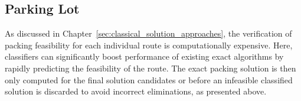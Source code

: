 \subsection*{Parking Lot}
As discussed in Chapter~\ref{sec:classical_solution_approaches}, the verification of
packing feasibility for each individual route is computationally expensive.
Here, classifiers can significantly boost performance of existing exact algorithms by rapidly predicting the feasibility of the route. The
exact packing solution is then only computed for the final solution candidates or before an infeasible classified solution
is discarded to avoid incorrect eliminations, as presented above.
